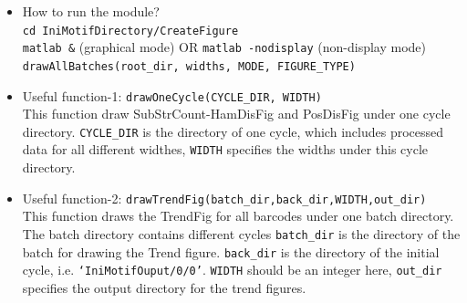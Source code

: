 \documentclass[a4paper,10pt]{article}
\begin{document}
\begin{itemize}
\item How to run the module? \\
\verb+cd IniMotifDirectory/CreateFigure+ \\
\verb+matlab &+ (graphical mode) OR \verb+matlab -nodisplay+ (non-display mode) \\
\verb+drawAllBatches(root_dir, widths, MODE, FIGURE_TYPE)+

\item Useful function-1: \verb+drawOneCycle(CYCLE_DIR, WIDTH)+ \\
This function draw SubStrCount-HamDisFig and PosDisFig under one cycle
directory. \texttt{CYCLE\_DIR} is the directory of one cycle, which includes processed data
for all different widthes, \texttt{WIDTH} specifies the widths under this cycle directory.

\item Useful function-2: \verb+drawTrendFig(batch_dir,back_dir,WIDTH,out_dir)+ \\
This function draws the TrendFig for all barcodes under one batch directory.
The batch directory contains different cycles \texttt{batch\_dir} is the directory of the batch for drawing the Trend figure.
\texttt{back\_dir} is the directory of the initial cycle, i.e. \texttt{`IniMotifOuput/0/0'}. 
\texttt{WIDTH} should be an integer here, \texttt{out\_dir} specifies the output directory for the trend figures.

\end{itemize}
\end{document}
